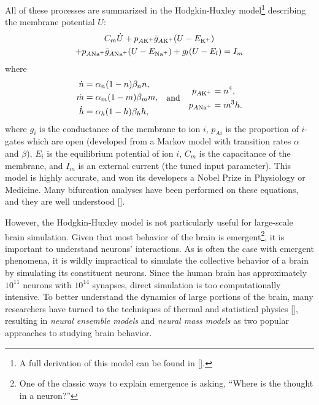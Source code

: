 All of these processes are summarized in the Hodgkin-Huxley model\footnote{A full derivation of this model can be found in [].} describing the membrane potential $U$:
\begin{multline}
  \label{eq:hodgkin_huxley_main}
  C_{m} \dot{U}
  +
  p_{A \ce{K^{+}}} \mean{g}_{A \ce{K^{+}}} \pqty{U - E_{\ce{K^{+}}}} \\
  +
  p_{A \ce{Na^{+}}} \mean{g}_{A \ce{Na^{+}}} \pqty{U - E_{\ce{Na^{+}}}}
  +
  g_{l} \pqty{U - E_{l}}
  =
  I_{m}
\end{multline}
where
\begin{equation}
  \label{eq:hodgkin_huxley_supplementary}
  \begin{aligned}
    \dot{n}
    &=
    \alpha_{n} \pqty{1 - n} \beta_{n} n, \\
    \dot{m}
    &=
    \alpha_{m} \pqty{1 - m} \beta_{m} m, \\
    \dot{h}
    &=
    \alpha_{h} \pqty{1 - h} \beta_{h} h,
  \end{aligned}
  \qand
  \begin{aligned}
    p_{A \ce{K^{+}}}
    &=
    n^{4}, \\
    p_{A \ce{Na^{+}}}
    &=
    m^{3} h.
  \end{aligned}
\end{equation}
where $g_{i}$ is the conductance of the membrane to ion $i$, $p_{A i}$ is the proportion of $i$-gates which are open (developed from a Markov model with transition rates $\alpha$ and $\beta$), $E_{i}$ is the equilibrium potential of ion $i$, $C_{m}$ is the capacitance of the membrane, and $I_{m}$ is an external current (the tuned input parameter).
This model is highly accurate, and won its developers a Nobel Prize in Physiology or Medicine.
Many bifurcation analyses have been performed on these equations, and they are well understood [].

However, the Hodgkin-Huxley model is not particularly useful for large-scale brain simulation.
Given that most behavior of the brain is emergent\footnote{One of the classic ways to explain emergence is asking, ``Where is the thought in a neuron?''}, it is important to understand neurons' interactions.
As is often the case with emergent phenomena, it is wildly impractical to simulate the collective behavior of a brain by simulating its constituent neurons.
Since the human brain has approximately $10^{11}$ neurons with $10^{14}$ synapses, direct simulation is too computationally intensive.
To better understand the dynamics of large portions of the brain, many researchers have turned to the techniques of thermal and statistical physics [],
resulting in \textit{neural ensemble models} and \textit{neural mass models} as two popular approaches to studying brain behavior.

